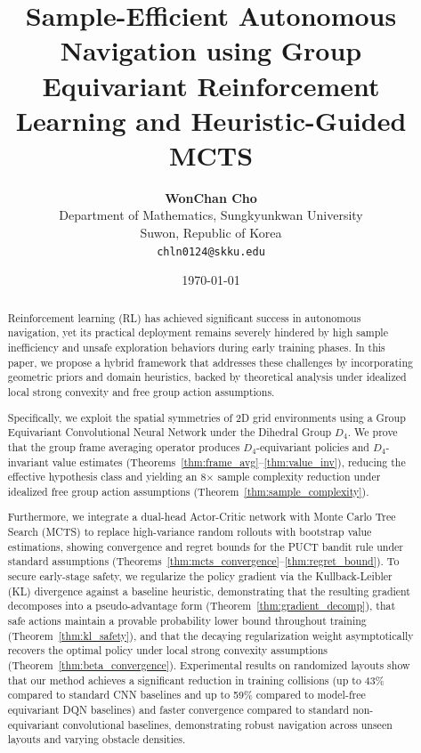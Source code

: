 \documentclass{article}
\title{\textbf{Sample-Efficient Autonomous Navigation using Group Equivariant
Reinforcement Learning and Heuristic-Guided MCTS}}
\author{
  \textbf{WonChan Cho} \\
  Department of Mathematics, Sungkyunkwan University \\
  Suwon, Republic of Korea \\
  \texttt{chln0124@skku.edu}
}
\date{\today}
\begin{document}
\maketitle

\begin{abstract}
Reinforcement learning (RL) has achieved significant success in autonomous navigation, yet its practical deployment remains severely hindered by high sample inefficiency and unsafe exploration behaviors during early training phases. In this paper, we propose a hybrid framework that addresses these challenges by incorporating geometric priors and domain heuristics, backed by theoretical analysis under idealized local strong convexity and free group action assumptions.

Specifically, we exploit the spatial symmetries of 2D grid environments using a Group Equivariant Convolutional Neural Network under the Dihedral Group $D_4$. We prove that the group frame averaging operator produces $D_4$-equivariant policies and $D_4$-invariant value estimates (Theorems~\ref{thm:frame_avg}--\ref{thm:value_inv}), reducing the effective hypothesis class and yielding an 8$\times$ sample complexity reduction under idealized free group action assumptions (Theorem~\ref{thm:sample_complexity}).

Furthermore, we integrate a dual-head Actor-Critic network with Monte Carlo Tree Search (MCTS) to replace high-variance random rollouts with bootstrap value estimations, showing convergence and regret bounds for the PUCT bandit rule under standard assumptions (Theorems~\ref{thm:mcts_convergence}--\ref{thm:regret_bound}). To secure early-stage safety, we regularize the policy gradient via the Kullback-Leibler (KL) divergence against a baseline heuristic, demonstrating that the resulting gradient decomposes into a pseudo-advantage form (Theorem~\ref{thm:gradient_decomp}), that safe actions maintain a provable probability lower bound throughout training (Theorem~\ref{thm:kl_safety}), and that the decaying regularization weight asymptotically recovers the optimal policy under local strong convexity assumptions (Theorem~\ref{thm:beta_convergence}). Experimental results on randomized layouts show that our method achieves a significant reduction in training collisions (up to 43\% compared to standard CNN baselines and up to 59\% compared to model-free equivariant DQN baselines) and faster convergence compared to standard non-equivariant convolutional baselines, demonstrating robust navigation across unseen layouts and varying obstacle densities.
\end{abstract}
\end{document}
